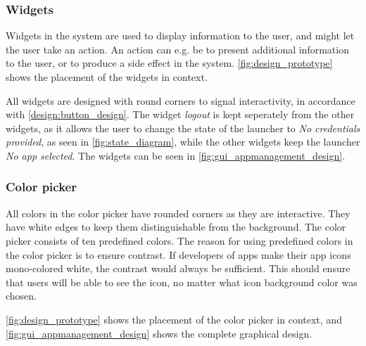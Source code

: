 \subsubsection{Widgets}
\label{par:widgets}
Widgets in the \giraf[] system are used to display information to the user, and might let the user take an action.  
An action can e.g. be to present additional information to the user, or to produce a side effect in the system. 
\autoref{fig:design_prototype} shows the placement of the widgets in context.

All widgets are designed with round corners to signal interactivity, in accordance with \autoref{design:button_design}.
The widget \emph{logout} is kept seperately from the other widgets, as it allows the user to change the state of the launcher to \emph{No credentials provided}, as seen in \autoref{fig:state_diagram}, while the other widgets keep the launcher \emph{No app selected}.
The widgets can be seen in \autoref{fig:gui_appmanagement_design}.

\subsubsection{Color picker}
\label{par:colorpicker}
All colors in the color picker have rounded corners as they are interactive.
They have white edges to keep them distinguishable from the background.
The color picker consists of ten predefined colors. 
The reason for using predefined colors in the color picker is to ensure contrast. 
If developers of \giraf[] apps make their app icons mono-colored white, the contrast would always be sufficient. 
This should ensure that users will be able to see the icon, no matter what icon background color was chosen.

\autoref{fig:design_prototype} shows the placement of the color picker in context, and \autoref{fig:gui_appmanagement_design} shows the complete graphical design.